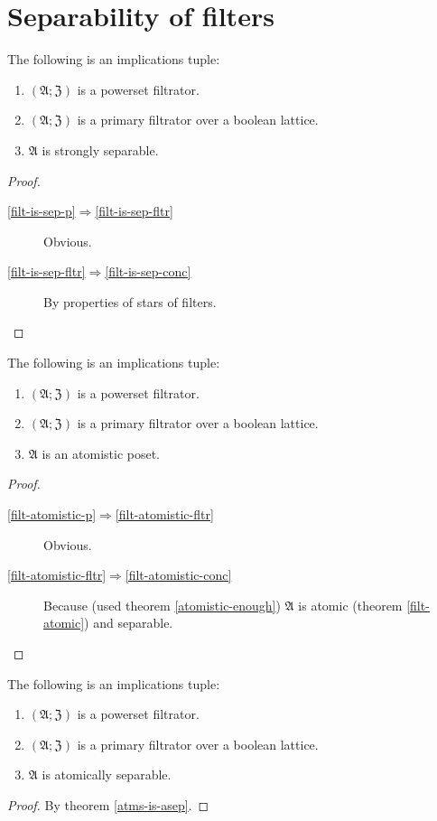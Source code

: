 \section{Separability of filters}
\begin{prop}
\label{filt-is-sep}The following is an implications tuple:
\begin{enumerate}
\item \label{filt-is-sep-p}$(\mathfrak{A};\mathfrak{Z})$ is a powerset
filtrator.
\item \label{filt-is-sep-fltr}$(\mathfrak{A};\mathfrak{Z})$ is a primary
filtrator over a boolean lattice.
\item \label{filt-is-sep-conc}$\mathfrak{A}$ is strongly separable.
\end{enumerate}
\end{prop}
\begin{proof}
~
\begin{description}
\item [{\ref{filt-is-sep-p}$\Rightarrow$\ref{filt-is-sep-fltr}}] Obvious.
\item [{\ref{filt-is-sep-fltr}$\Rightarrow$\ref{filt-is-sep-conc}}] By
properties of stars of filters.
\end{description}
\end{proof}
\begin{thm}
\label{filt-atomistic}The following is an implications tuple:
\begin{enumerate}
\item \label{filt-atomistic-p}$(\mathfrak{A};\mathfrak{Z})$ is a powerset
filtrator.
\item \label{filt-atomistic-fltr}$(\mathfrak{A};\mathfrak{Z})$ is a primary
filtrator over a boolean lattice.
\item \label{filt-atomistic-conc}$\mathfrak{A}$ is an atomistic poset.
\end{enumerate}
\end{thm}
\begin{proof}
~
\begin{description}
\item [{\ref{filt-atomistic-p}$\Rightarrow$\ref{filt-atomistic-fltr}}] Obvious.
\item [{\ref{filt-atomistic-fltr}$\Rightarrow$\ref{filt-atomistic-conc}}] Because
(used theorem \ref{atomistic-enough}) $\mathfrak{A}$ is atomic
(theorem \ref{filt-atomic}) and separable.
\end{description}
\end{proof}
\begin{cor}
\label{f-atom-sep}The following is an implications tuple:
\begin{enumerate}
\item $(\mathfrak{A};\mathfrak{Z})$ is a powerset filtrator.
\item $(\mathfrak{A};\mathfrak{Z})$ is a primary filtrator over a boolean
lattice.
\item $\mathfrak{A}$ is atomically separable.
\end{enumerate}
\end{cor}
\begin{proof}
By theorem \ref{atms-is-asep}.
\end{proof}

